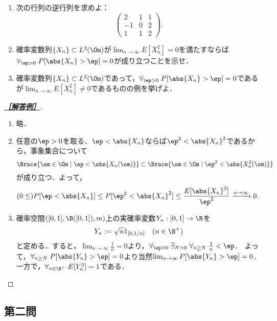 \documentclass[uplatex,dvipdfmx]{jsarticle}
\begin{document}
\begin{tcolorbox}[colframe=ForestGreen, colback=ForestGreen!10!white,breakable,colbacktitle=ForestGreen!40!white,coltitle=black,fonttitle=\bfseries\sffamily,
    title=第１問]
    \begin{problem}\mbox{}
        \begin{enumerate}
            \item 次の行列の逆行列を求めよ：
            \[\begin{pmatrix}2&1&1\\-1&0&2\\1&1&2\end{pmatrix}.\]
            \item 確率変数列$\{X_n\}\subset L^2(\Om)$が$\lim_{n\to\infty}E[X_n^2]=0$を満たすならば$\forall_{\ep>0}\;P[\abs{X_n}>\ep]=0$が成り立つことを示せ．
            \item 確率変数列$\{X_n\}\subset L^2(\Om)$であって，$\forall_{\ep>0}\;P[\abs{X_n}>\ep]=0$であるが$\lim_{n\to\infty}E[X_n^2]\ne0$であるものの例を挙げよ．
        \end{enumerate}
    \end{problem}
\end{tcolorbox}
\begin{proof}[\textbf{\underline{［解答例］}}]\mbox{}
    \begin{enumerate}
        \item 略．
        \item 任意の$\ep>0$を取る．$\ep<\abs{X_n}$ならば$\ep^2<\abs{X_n}^2$であるから，事象集合について
        \[\Brace{\om\in\Om\mid\ep<\abs{X_n(\om)}}\subset\Brace{\om\in\Om\mid\ep^2<\abs{X_n^2(\om)}}\]
        が成り立つ．よって，
        \begin{align*}
            (0\le)P[\ep<\abs{X_n}]&\le P[\ep^2<\abs{X_n}^2]\le\frac{E[\abs{X_n}^2]}{\ep^2}\xrightarrow{n\to\infty}0.
        \end{align*}
        \item 確率空間$([0,1],\B([0,1]),m)$上の実確率変数$Y_n:[0,1]\to\R$を
        \[Y_n:=\sqrt{n}1_{[0,1/n]}\quad(n\in\N^+)\]
        と定める．すると，$\lim_{n\to\infty}\frac{1}{n}=0$より，$\forall_{\ep>0}\;\exists_{N>0}\;\forall_{n\ge N}\;\frac{1}{n}<\ep$．
        よって，$\forall_{n\ge N}\;P[\abs{Y_n}>\ep]=0$より当然$\lim_{n\to\infty}P[\abs{Y_n}>\ep]=0$．
        一方で，$\forall_{n\in\N^+}\;E[Y_n^2]=1$である．
    \end{enumerate}
\end{proof}

\subsection{第二問}
\end{document}
